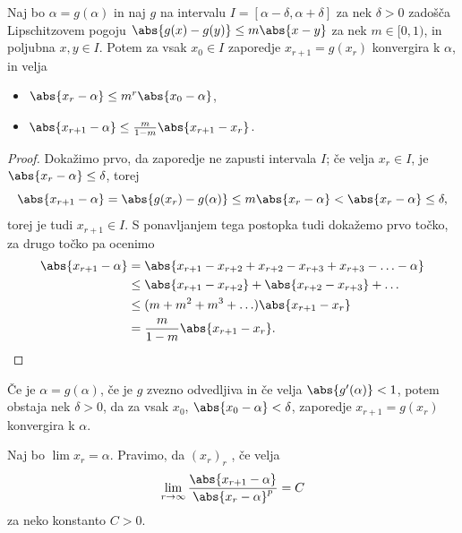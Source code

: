 \begin{izrek}
  Naj bo $\alpha = g(\alpha)$ in naj $g$ na intervalu $I = [\alpha - \delta,
  \alpha + \delta]$ za nek $\delta > 0$ zadošča Lipschitzovem pogoju $\abs{g(x)
	- g(y)} \le m \abs{x - y}$ za nek $m \in [0, 1)$, in poljubna $x, y \in I$.
  Potem za vsak $x_0 \in I$ zaporedje $x_{r+1} = g(x_r)$ konvergira k $\alpha$,
  in velja
  \begin{itemize}
  \item $\abs{x_r - \alpha} \le m^r \abs{x_0 - \alpha}$,
  \item $\abs{x_{r+1} - \alpha} \le \frac{m}{1-m} \abs{x_{r+1} - x_r}$.
  \end{itemize}
\end{izrek}

\begin{proof}
  Dokažimo prvo, da zaporedje ne zapusti intervala $I$;
  če velja $x_r \in I$, je $\abs{x_r - \alpha} \le \delta$, torej
  \[
	\abs{x_{r+1} - \alpha} = \abs{g(x_r) - g(\alpha)}
	\le m \abs{x_r - \alpha} < \abs{x_r - \alpha}
	\le \delta,
  \]
  torej je tudi $x_{r+1} \in I$.
  S ponavljanjem tega postopka tudi dokažemo prvo točko, za drugo točko pa
  ocenimo
  \begin{align*}
	\abs{x_{r+1} - \alpha}
	&= \abs{x_{r+1} - x_{r+2} + x_{r+2} - x_{r+3} + x_{r+3} - \ldots - \alpha} \\
	&\le \abs{x_{r+1} - x_{r+2}} + \abs{x_{r+2} - x_{r+3}} + \ldots \\
	&\le (m + m^2 + m^3 + \ldots) \abs{x_{r+1} - x_r} \\
	&= \frac{m}{1-m} \abs{x_{r+1} - x_r}.
  \end{align*}
\end{proof}

\begin{posledica}
  Če je $\alpha = g(\alpha)$, če je $g$ zvezno odvedljiva in če velja
  $\abs{g'(\alpha)} < 1$, potem obstaja nek $\delta > 0$, da za vsak $x_0$,
  $\abs{x_0 - \alpha} < \delta$, zaporedje $x_{r+1} = g(x_r)$ konvergira k
  $\alpha$.
\end{posledica}


\begin{definicija}
  Naj bo $\lim x_r = \alpha$.
  Pravimo, da ${(x_r)}_r$ , če velja
  \[
	\lim_{r \to \infty} \frac{\abs{x_{r+1} - \alpha}}{\abs{x_r - \alpha}^p} = C
  \]
  za neko konstanto $C > 0$.
\end{definicija}

